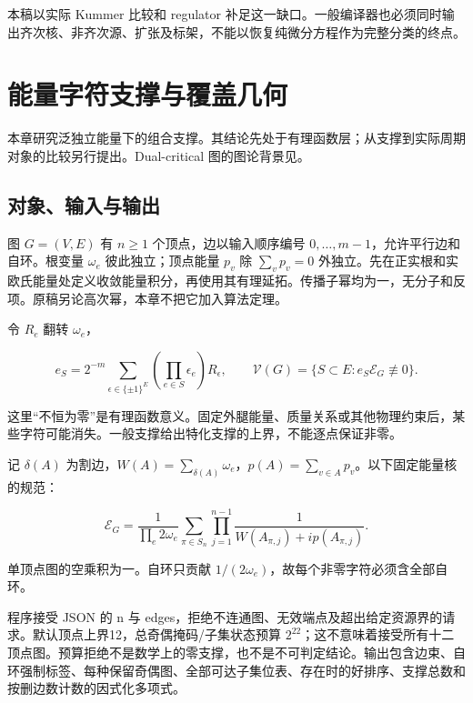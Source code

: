 \documentclass[11pt,a4paper,oneside]{ctexrep}
\theoremstyle{cnplain}
\theoremstyle{definition}
\theoremstyle{remark}
\begin{document}
本稿以实际 Kummer 比较和 regulator 补足这一缺口。一般编译器也必须同时输出齐次核、非齐次源、扩张及标架，不能以恢复纯微分方程作为完整分类的终点。


\chapter{能量字符支撑与覆盖几何}\label{ch:graph}
本章研究泛独立能量下的组合支撑。其结论先处于有理函数层；从支撑到实际周期对象的比较另行提出。Dual-critical 图的图论背景见\cite{dualcritical}。
\section{对象、输入与输出}\label{sec:graph:1}

图 \(G=(V,E)\) 有 \(n\geq1\) 个顶点，边以输入顺序编号 \(0,\ldots,m-1\)，允许平行边和自环。根变量 \(\omega_e\) 彼此独立；顶点能量 \(p_v\) 除 \(\sum_vp_v=0\) 外独立。先在正实根和实欧氏能量处定义收敛能量积分，再使用其有理延拓。传播子幂均为一，无分子和反项。原稿另论高次幂，本章不把它加入算法定理。

令 \(R_e\) 翻转 \(\omega_e\)，

\begin{equation}
e_S=2^{-m}\sum_{\epsilon\in\{\pm1\}^{E}}
       \left(\prod_{e\in S}\epsilon_e\right)R_\epsilon,\qquad
 \mathcal V(G)=\{S\subset E:e_S\mathscr E_G\not\equiv0\}.
\end{equation}

这里``不恒为零''是有理函数意义。固定外腿能量、质量关系或其他物理约束后，某些字符可能消失。一般支撑给出特化支撑的上界，不能逐点保证非零。

记 \(\delta(A)\) 为割边，\(W(A)=\sum_{\delta(A)}\omega_e\)，\(p(A)=\sum_{v\in A}p_v\)。以下固定能量核的规范：

\begin{equation}
\mathscr E_G=
 \frac1{\prod_e2\omega_e}
 \sum_{\pi\in S_n}\prod_{j=1}^{n-1}
 \frac1{W(A_{\pi,j})+ip(A_{\pi,j})}.                 \label{eq:graph:1}
\end{equation}

单顶点图的空乘积为一。自环只贡献 \(1/(2\omega_e)\)，故每个非零字符必须含全部自环。

程序接受 JSON 的 n 与 edges，拒绝不连通图、无效端点及超出给定资源界的请求。默认顶点上界12，总奇偶掩码/子集状态预算 \(2^{22}\)；这不意味着接受所有十二顶点图。预算拒绝不是数学上的零支撑，也不是不可判定结论。输出包含边束、自环强制标签、每种保留奇偶图、全部可达子集位表、存在时的好排序、支撑总数和按删边数计数的因式化多项式。
\end{document}
